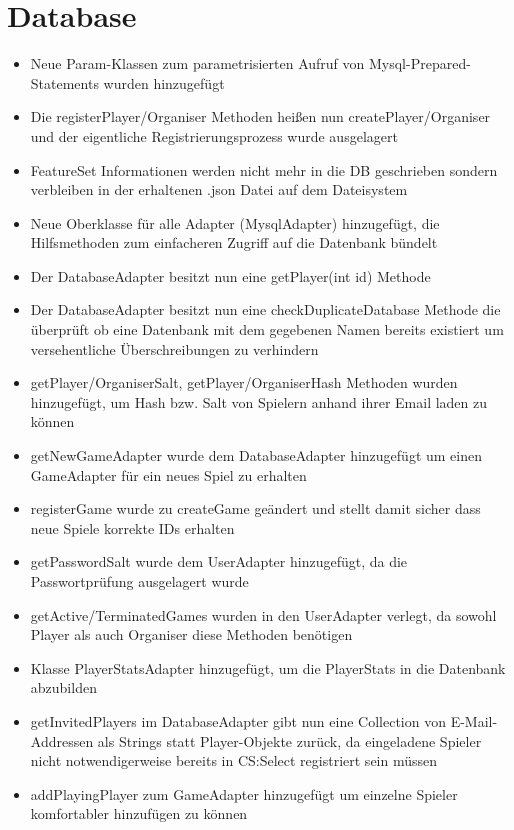 \documentclass[a4paper]{scrreprt}
\begin{document}
\section{Database}
\begin{itemize}
    \item Neue Param-Klassen zum parametrisierten Aufruf von Mysql-Prepared-Statements wurden hinzugefügt
    \item Die registerPlayer/Organiser Methoden heißen nun createPlayer/Organiser und der eigentliche Registrierungsprozess wurde ausgelagert
    \item FeatureSet Informationen werden nicht mehr in die DB geschrieben sondern verbleiben in der erhaltenen .json Datei auf dem Dateisystem
    \item Neue Oberklasse für alle Adapter (MysqlAdapter) hinzugefügt, die Hilfsmethoden zum einfacheren Zugriff auf die Datenbank bündelt
    \item Der DatabaseAdapter besitzt nun eine getPlayer(int id) Methode
    \item Der DatabaseAdapter besitzt nun eine checkDuplicateDatabase Methode die überprüft ob eine Datenbank mit dem gegebenen Namen bereits existiert um versehentliche Überschreibungen zu verhindern
    \item getPlayer/OrganiserSalt, getPlayer/OrganiserHash Methoden wurden hinzugefügt, um Hash bzw. Salt von Spielern anhand ihrer Email laden zu können
    \item getNewGameAdapter wurde dem DatabaseAdapter hinzugefügt um einen GameAdapter für ein neues Spiel zu erhalten
    \item registerGame wurde zu createGame geändert und stellt damit sicher dass neue Spiele korrekte IDs erhalten
    \item getPasswordSalt wurde dem UserAdapter hinzugefügt, da die Passwortprüfung ausgelagert wurde
    \item getActive/TerminatedGames wurden in den UserAdapter verlegt, da sowohl Player als auch Organiser diese Methoden benötigen
    \item Klasse PlayerStatsAdapter hinzugefügt, um die PlayerStats in die Datenbank abzubilden
    \item getInvitedPlayers im DatabaseAdapter gibt nun eine Collection von E-Mail-Addressen als Strings statt Player-Objekte zurück, da eingeladene Spieler nicht notwendigerweise bereits in CS:Select registriert sein müssen
    \item addPlayingPlayer zum GameAdapter hinzugefügt um einzelne Spieler komfortabler hinzufügen zu können
\end{itemize}
\end{document}
